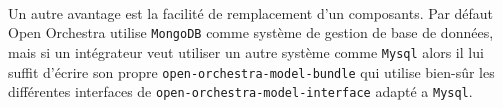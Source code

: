    \paragraph{}
   Un autre avantage est la facilité de remplacement d'un composants. Par défaut Open Orchestra utilise \verb?MongoDB? comme système de gestion de base de données, mais si un intégrateur veut utiliser un autre système comme \verb?Mysql? alors il lui suffit d'écrire son propre \newline  \verb?open-orchestra-model-bundle? qui utilise bien-sûr les différentes interfaces de  \newline  \verb?open-orchestra-model-interface? adapté a \verb?Mysql?.